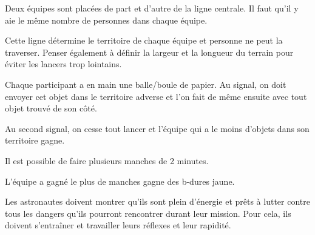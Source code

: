 \documentclass{grand-jeu}
\begin{document}
\begin{liste-materiel}
\end{liste-materiel}

\begin{regles}
Deux équipes sont placées de part et d’autre de la ligne centrale. Il faut qu'il y aie le même nombre de personnes dans chaque équipe. 

Cette ligne détermine le territoire de chaque équipe et personne ne peut la traverser. Penser également à définir la largeur et la longueur du terrain pour éviter les lancers trop lointains.

Chaque participant a en main une balle/boule de papier. Au signal, on doit envoyer cet objet dans le territoire adverse et l’on fait de même ensuite avec tout objet trouvé de son côté. 

Au second signal, on cesse tout lancer et l’équipe qui a le moins d’objets dans son territoire gagne.

Il est possible de faire plusieurs manches de 2 minutes.

L’équipe a gagné le plus de manches gagne des b-dures jaune. 
\end{regles}

\begin{imaginaire}
Les astronautes doivent montrer qu'ils sont plein d'énergie et prêts à lutter contre tous les dangers qu'ils pourront rencontrer durant leur mission. Pour cela, ils doivent s'entraîner et travailler leurs réflexes et leur rapidité.
\end{imaginaire}

\begin{moments-stop}
\end{moments-stop}
\end{document}
